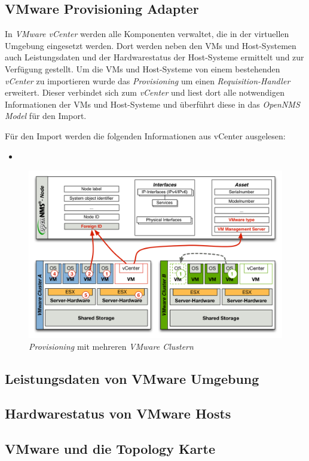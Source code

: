 \subsection{VMware Provisioning Adapter}
In \emph{VMware vCenter} werden alle Komponenten verwaltet, die in der virtuellen Umgebung eingesetzt werden. Dort werden neben den VMs und Host-Systemen auch Leistungsdaten und der Hardwarestatus der Host-Systeme ermittelt und zur Verfügung gestellt. Um die VMs und Host-Systeme von einem bestehenden \emph{vCenter} zu importieren wurde das \emph{Provisioning} um einen \emph{Requisition-Handler} erweitert. Dieser verbindet sich zum \emph{vCenter} und liest dort alle notwendigen Informationen der VMs und Host-Systeme und überführt diese in das \emph{OpenNMS Model} für den Import.

Für den Import werden die folgenden Informationen aus vCenter ausgelesen:
\begin{itemize}
  \item \textit{}
\end{itemize}

\begin{figure}[H]
	\centering
	\includegraphics[width=1.0\textwidth]{images/3rd-party/vmware/vmware-cluster}
	\caption{\emph{Provisioning} mit mehreren \emph{VMware Clustern}}
	\label{pic:lab}
\end{figure}


\subsection{Leistungsdaten von VMware Umgebung}

\subsection{Hardwarestatus von VMware Hosts}

\subsection{VMware und die Topology Karte}
